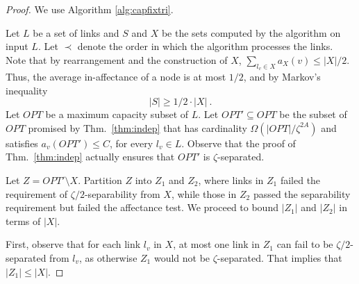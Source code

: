 \documentclass[11pt]{amsart}
\begin{document}
\begin{proof}
We use Algorithm \ref{alg:capfixtri}.


Let $L$ be a set of links and $S$ and $X$ be the sets computed by the
algorithm on input $L$. 
Let $\prec$ denote the order in which the algorithm processes the links.
Note that by rearrangement and the construction of
$X$, $\sum_{l_v \in X} a_X(v) \leq |X|/2$.  Thus, the average
in-affectance of a node is at most $1/2$, and by Markov's inequality
\begin{equation}
|S| \geq 1/2\cdot |X| \ .
\label{eq:s-x}
\end{equation}
Let $OPT$ be a maximum capacity subset of $L$. Let $OPT' \subseteq
OPT$ be the subset of $OPT$ promised by Thm.~\ref{thm:indep} that has
cardinality $\Omega(|OPT|/\zeta^{2A})$ and satisfies $a_v(OPT') \le
C$, for every $l_v \in L$.  Observe that the proof of
Thm.~\ref{thm:indep} actually ensures that $OPT'$ is
$\zeta$-separated.

Let $Z = OPT' \setminus X$.  Partition $Z$ into $Z_1$ and $Z_2$, where
links in $Z_1$ failed the requirement of $\zeta/2$-separability from
$X$, while those in $Z_2$ passed the separability requirement but failed
the affectance test. We proceed to bound $|Z_1|$ and $|Z_2|$ in terms of $|X|$.

First, observe that for each link $l_v$ in $X$, at most one link in
$Z_1$ can fail to be $\zeta/2$-separated from $l_v$, as otherwise
$Z_1$ would not be $\zeta$-separated.  That implies that $|Z_1| \le
|X|$.


\end{proof}
\end{document}
